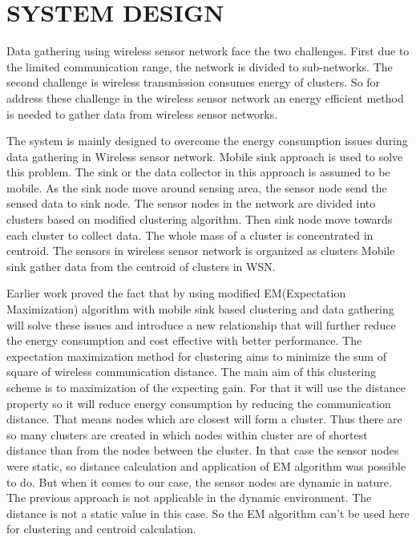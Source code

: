 \documentclass[MTech]{iitmdiss}
\begin{document}
\chapter{SYSTEM DESIGN}
\label{chap:sysstud}
Data gathering using wireless sensor network face the two challenges. First due to the limited communication range, the network is divided to sub-networks. The second challenge is wireless transmission consumes energy of clusters. So for address these challenge in the wireless sensor network an energy efficient method is needed to gather data from wireless sensor networks.


The system is mainly designed to overcome the energy consumption issues during data gathering in Wireless sensor network. Mobile sink approach is used to solve this problem. The sink or the data collector in this approach is  assumed to be mobile. As the sink node move around sensing area, the sensor node send the sensed data to sink node. The sensor nodes in the network are divided into clusters based on modified clustering algorithm. Then sink node move towards each cluster to collect data. The whole mass of a cluster is concentrated in centroid. The sensors in wireless sensor network is organized as clusters Mobile sink gather data from the centroid of clusters in WSN.


	 Earlier work proved the fact that by using modified EM(Expectation Maximization) algorithm with mobile sink based clustering and data gathering will solve these issues and introduce a new relationship that will further reduce the energy consumption and cost effective with better performance. The expectation maximization method for clustering aims to minimize the sum of square of wireless communication distance. The main aim of this clustering scheme is to maximization of the expecting gain. For that it will use the distance property so it will reduce energy consumption by reducing the communication distance. That means nodes which are closest will form a cluster. Thus there are so many clusters are created in which nodes within cluster are of shortest distance than from the nodes between the cluster. In that case the sensor nodes were static, so distance calculation and application of EM algorithm was possible to do. But when it comes to our case, the sensor nodes are dynamic in nature. The previous approach is not applicable in the dynamic environment. The distance is not a static value in this case. So the EM algorithm can't be used here for clustering and centroid calculation.
\end{document}
